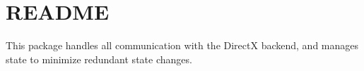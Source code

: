 \chapter{README}
\hypertarget{md_panda_2src_2dxgsg9_2README}{}\label{md_panda_2src_2dxgsg9_2README}
This package handles all communication with the DirectX backend, and manages state to minimize redundant state changes. 